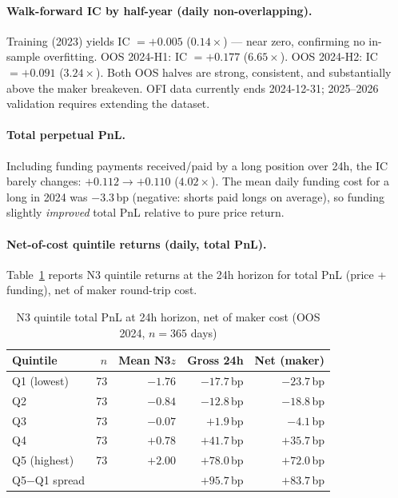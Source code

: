 \documentclass[12pt, a4paper]{article}
\theoremstyle{definition}
\begin{document}
\paragraph{Walk-forward IC by half-year (daily non-overlapping).}
Training (2023) yields IC $= +0.005$ ($0.14\times$) --- near zero, confirming
no in-sample overfitting.  OOS 2024-H1: IC $= +0.177$ ($6.65\times$).
OOS 2024-H2: IC $= +0.091$ ($3.24\times$).  Both OOS halves are strong,
consistent, and substantially above the maker breakeven.  OFI data currently
ends 2024-12-31; 2025--2026 validation requires extending the dataset.

\paragraph{Total perpetual PnL.}
Including funding payments received/paid by a long position over 24h,
the IC barely changes: $+0.112 \to +0.110$ ($4.02\times$).  The mean daily
funding cost for a long in 2024 was $-3.3$\,bp (negative: shorts paid longs
on average), so funding slightly \emph{improved} total PnL relative to pure
price return.

\paragraph{Net-of-cost quintile returns (daily, total PnL).}
Table~\ref{tab:n3_quintile} reports N3 quintile returns at the 24h horizon
for total PnL (price + funding), net of maker round-trip cost.

\begin{table}[ht]
\centering
\caption{N3 quintile total PnL at 24h horizon, net of maker cost (OOS 2024, $n=365$ days)}
\label{tab:n3_quintile}
\begin{tabular}{lrrrr}
\toprule
Quintile & $n$ & Mean N3$z$ & Gross 24h & Net (maker) \\
\midrule
Q1 (lowest)  & 73 & $-1.76$ & $-17.7$\,bp & $-23.7$\,bp \\
Q2           & 73 & $-0.84$ & $-12.8$\,bp & $-18.8$\,bp \\
Q3           & 73 & $-0.07$ & $+1.9$\,bp  & $-4.1$\,bp  \\
Q4           & 73 & $+0.78$ & $+41.7$\,bp & $+35.7$\,bp \\
Q5 (highest) & 73 & $+2.00$ & $+78.0$\,bp & $+72.0$\,bp \\
\midrule
Q5$-$Q1 spread & & & $+95.7$\,bp & $+83.7$\,bp \\
\bottomrule
\end{tabular}
\end{table}
\end{document}
